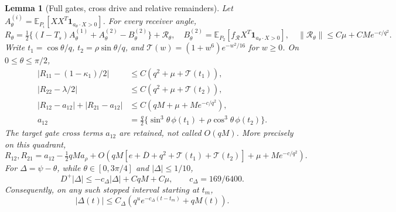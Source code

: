 \documentclass[11pt]{article}
\newtheorem{lemma}[theorem]{Lemma}
\theoremstyle{remark}\newtheorem{remark}[theorem]{Remark}
\newcommand{\E}{\mathbb E}
\newcommand{\one}{\mathbf1}
\begin{document}
\begin{lemma}[Full gates, cross drive and relative remainders]
\label{an02q2ecv1:field}
Let $A^{(i)}_\theta=\E_{P_i}[XX^T\one_{a_\theta\cdot X>0}]$.
For every receiver angle,
\begin{equation}
 R_\theta=\tfrac12\{(I-T_s)A^{(1)}_\theta+
                         A^{(2)}_\theta-B^{(2)}_\theta\}+\mathcal R_\theta,
 \quad
 B^{(2)}_\theta=\E_{P_2}[f_{\mathcal R}X^T\one_{a_\theta\cdot X>0}],
 \quad
 \|\mathcal R_\theta\|\le C\mu+CM e^{-c/q^2}.
 \label{an02q2ecv1:fullgates}
\end{equation}
Write $t_1=\cos\theta/q$, $t_2=\rho\sin\theta/q$, and
$\mathcal T(w)=(1+w^6)e^{-w^2/16}$ for $w\ge0$.
On $0\le\theta\le\pi/2$,
\begin{align}
 |R_{11}-(1-\kappa_1)/2|&\le C(q^2+\mu+\mathcal T(t_1)),\nonumber\\
 |R_{22}-\lambda/2|&\le C(q^2+\mu+\mathcal T(t_2)),\nonumber\\
 |R_{12}-a_{12}|+|R_{21}-a_{12}|&\le C(qM+\mu+M e^{-c/q^2}),\nonumber\\
 a_{12}&=\tfrac q2\{\sin^3\theta\,\phi(t_1)
                      +\rho\cos^3\theta\,\phi(t_2)\}.
 \label{an02q2ecv1:entries}
\end{align}
The target gate cross terms $a_{12}$ are retained, not called
$O(qM)$. More precisely on this quadrant,
\begin{equation}
 R_{12},R_{21}
 =a_{12}-\tfrac12qMa_\rho+
 O\!\left(qM[e+\overline D+q^2+\mathcal T(t_1)+\mathcal T(t_2)]
             +\mu+M e^{-c/q^2}\right).
 \label{an02q2ecv1:signedcross}
\end{equation}
For $\Delta=\psi-\theta$, while $\theta\in[0,3\pi/4]$ and
$|\Delta|\le1/10$,
\begin{equation}
 D^+|\Delta|\le-c_\Delta|\Delta|+CqM+C\mu,\qquad
 c_\Delta=169/6400.
 \label{an02q2ecv1:deltaineq}
\end{equation}
Consequently, on any such stopped interval starting at $t_m$,
\begin{equation}
 |\Delta(t)|\le C_\Delta(q^u e^{-c_\Delta(t-t_m)}+qM(t)).
 \label{an02q2ecv1:delta}
\end{equation}
\end{lemma}
\end{document}
